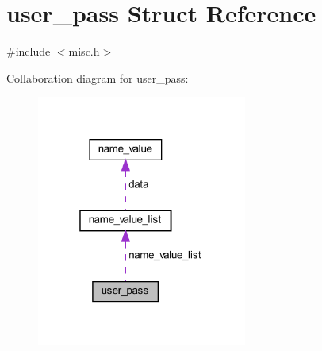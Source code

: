 \hypertarget{structuser__pass}{}\section{user\+\_\+pass Struct Reference}
\label{structuser__pass}


{\ttfamily \#include $<$misc.\+h$>$}



Collaboration diagram for user\+\_\+pass\+:
\nopagebreak
\begin{figure}[H]
\begin{center}
\leavevmode
\includegraphics[width=196pt]{structuser__pass__coll__graph}
\end{center}
\end{figure}
